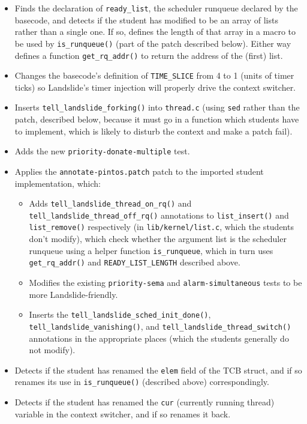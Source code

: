 \begin{itemize}
	\item Finds the declaration of {\tt ready\_list}, the scheduler runqueue declared by the basecode,
		and detects if the student has modified to be an array of lists rather than a single one.
		If so, defines the length of that array in a macro to be used by {\tt is\_runqueue()}
		(part of the patch described below).
		Either way defines a function {\tt get\_rq\_addr()} to return the address of the (first) list.
	\item Changes the basecode's definition of {\tt TIME\_SLICE} from 4 to 1 (units of timer ticks)
		so Landslide's timer injection will properly drive the context switcher.
	\item Inserts {\tt tell\_landslide\_forking()} into {\tt thread.c}
		(using {\tt sed} rather than the patch, described below,
		because it must go in a function which students have to implement,
		which is likely to disturb the context and make a patch fail).
	\item Adds the new {\tt priority-donate-multiple} test.
	\item Applies the {\tt annotate-pintos.patch} patch to the imported student implementation, which:
	\begin{itemize}
		\item Adds {\tt tell\_landslide\_thread\_on\_rq()}
			and {\tt tell\_landslide\_thread\_off\_rq()}
			annotations
			to {\tt list\_insert()} and {\tt list\_remove()} respectively
			(in {\tt lib/kernel/\allowbreak{}list.c}, which the students don't modify),
			which
			check whether the argument list
			is the scheduler runqueue
			using a helper function {\tt is\_runqueue},
			which in turn uses {\tt get\_rq\_addr()} and {\tt READY\_LIST\_LENGTH} described above.
		\item Modifies the existing {\tt priority-sema} and {\tt alarm-simultaneous} tests to be more Landslide-friendly.
		\item Inserts the {\tt tell\_landslide\_sched\_init\_done()},
			{\tt tell\_landslide\_vanishing()},
			and {\tt tell\_landslide\_thread\_switch()}
			annotations in the appropriate places
			(which the students generally do not modify).
	\end{itemize}
	\item Detects if the student has renamed the {\tt elem} field of the TCB struct,
		and if so renames its use in {\tt is\_runqueue()} (described above) correspondingly.
	\item Detects if the student has renamed the {\tt cur} (currently running thread) variable
		in the context switcher, and if so renames it back.
\end{itemize}

